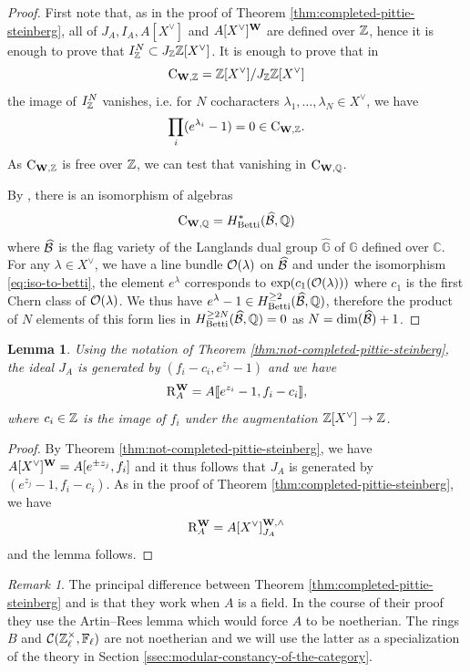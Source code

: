 \documentclass[a4paper, 10pt, oneside, reqno]{amsart}
\theoremstyle{plain}
\newtheorem{lem}[thm]{Lemma}
\theoremstyle{definition}
\theoremstyle{remark}
\newtheorem{rque}[thm]{Remark}
\newcommand{\Gbb}{\mathbb{G}}
\newcommand{\RR}{\mathrm{R}}
\newcommand{\C}{\mathbb{C}}
\newcommand{\Betti}{\mathrm{Betti}}
\newcommand{\Cc}{\mathrm{C}}
\begin{document}
\begin{proof}
First note that, as in the proof of Theorem \ref{thm:completed-pittie-steinberg}, all of $J_A, I_A, A[X^{\vee}]$ and $A[X^{\vee}]^{\mathbf{W}}$ are defined over $\mathbb{Z}$, hence it is enough to prove that $I_{\mathbb{Z}}^N \subset J_{\mathbb{Z}}\mathbb{Z}[X^{\vee}]$. It is enough to prove that in 
$$\Cc_{\Wbf, \Z} = \Z[X^{\vee}]/J_{\Z}\Z[X^{\vee}]$$
the image of $I_{\mathbb{Z}}^N$ vanishes, i.e.  for $N$ cocharacters $\lambda_1, \dots, \lambda_N \in X^{\vee}$, we have 
$$\prod_i (e^{\lambda_i} - 1) = 0 \in \Cc_{\Wbf, \Z}.$$
As $\Cc_{\Wbf, \Z}$ is free over $\mathbb{Z}$, we can test that vanishing in $\Cc_{\Wbf, \Q}$. 

By \cite{Borel}, there is an isomorphism of algebras
\begin{equation}\label{eq:iso-to-betti}
\Cc_{\Wbf, \Q} = H^*_{\Betti}(\widehat{\Bcal}, \Q)
\end{equation}
where $\widehat{\mathcal{B}}$ is the flag variety of the Langlands dual group $\widehat{\Gbb}$ of $\Gbb$ defined over $\C$. For any $\lambda \in X^{\vee}$, we have a line bundle $\mathcal{O}(\lambda)$ on $\widehat{\mathcal{B}}$ and under the isomorphism \eqref{eq:iso-to-betti}, the element $e^{\lambda}$ corresponds to $\exp(c_1(\mathcal{O}(\lambda)))$ where $c_1$ is the first Chern class of $\mathcal{O}(\lambda)$. We thus have $e^{\lambda} - 1 \in H^{\geq 2}_{\Betti}(\widehat{\Bcal}, \Q)$, therefore the product of $N$ elements of this form lies in $H^{\geq 2N}_{\Betti}(\widehat{\Bcal}, \Q) = 0$ as $N = \dim(\widehat{\mathcal{B}}) + 1$.
\end{proof}

\begin{lem}\label{lem:invariant-ring-is-a-power-series}
Using the notation of Theorem \ref{thm:not-completed-pittie-steinberg}, the ideal $J_A$ is generated by $(f_i - c_i, e^{z_j} - 1)$ and we have 
$$\RR_A^{\Wbf} = A\llbracket e^{z_i}-1, f_i - c_i \rrbracket,$$
where $c_i \in \mathbb{Z}$ is the image of $f_i$ under the augmentation $\mathbb{Z}[X^{\vee}] \to \mathbb{Z}$. 
\end{lem}

\begin{proof}
By Theorem \ref{thm:not-completed-pittie-steinberg}, we have $A[X^{\vee}]^{\mathbf{W}} = A[e^{\pm z_j}, f_i]$ and it thus follows that $J_A$ is generated by $(e^{z_j}-1, f_i - c_i)$. As in the proof of Theorem \ref{thm:completed-pittie-steinberg}, we have
$$\RR_A^{\Wbf} = A[X^{\vee}]^{\Wbf, \wedge}_{J_A}$$
and the lemma follows. 
\end{proof}

\begin{rque}
The principal difference between Theorem \ref{thm:completed-pittie-steinberg} and \cite[Theorem 8.1]{BezrukavnikovRiche} is that they work when $A$ is a field. In the course of their proof they use the Artin--Rees lemma which would force $A$ to be noetherian. The rings $B$ and $\mathcal{C}(\mathbb{Z}_{\ell}^{\times}, \mathbb{F}_{\ell})$ are not noetherian and we will use the latter as a specialization of the theory in Section \ref{ssec:modular-constancy-of-the-category}.
\end{rque}
\end{document}
